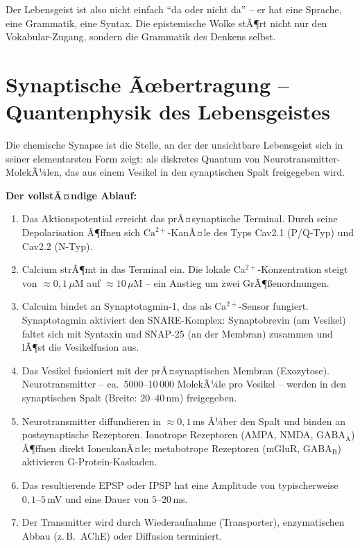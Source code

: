﻿\documentclass[12pt,a4paper]{report}
\theoremstyle{plain}
\theoremstyle{definition}
\theoremstyle{remark}
\begin{document}
	Der Lebensgeist ist also nicht einfach ``da oder nicht da'' -- er hat eine
	Sprache, eine Grammatik, eine Syntax. Die epistemische Wolke stÃ¶rt
	nicht nur den Vokabular-Zugang, sondern die Grammatik des Denkens selbst.
	
	\section{Synaptische Ãœbertragung -- Quantenphysik des Lebensgeistes}
	
	Die chemische Synapse ist die Stelle, an der der unsichtbare Lebensgeist
	sich in seiner elementarsten Form zeigt: als diskretes Quantum von
	Neurotransmitter-MolekÃ¼len, das aus einem Vesikel in den synaptischen
	Spalt freigegeben wird.
	
	\textbf{Der vollstÃ¤ndige Ablauf:}
	\begin{enumerate}[label=\arabic*., leftmargin=1.8cm]
		\item Das Aktionspotential erreicht das prÃ¤synaptische Terminal.
		Durch seine Depolarisation Ã¶ffnen sich $\mathrm{Ca}^{2+}$-KanÃ¤le
		des Typs Cav2.1 (P/Q-Typ) und Cav2.2 (N-Typ).
		\item Calcium strÃ¶mt in das Terminal ein.
		Die lokale Ca$^{2+}$-Konzentration steigt von $\approx 0{,}1\,\mu$M
		auf $\approx 10\,\mu$M -- ein Anstieg um zwei GrÃ¶\ss{}enordnungen.
		\item Calcuim bindet an Synaptotagmin-1, das als Ca$^{2+}$-Sensor fungiert.
		Synaptotagmin aktiviert den SNARE-Komplex: Synaptobrevin (am Vesikel)
		faltet sich mit Syntaxin und SNAP-25 (an der Membran) zusammen
		und lÃ¶st die Vesikelfusion aus.
		\item Das Vesikel fusioniert mit der prÃ¤synaptischen Membran
		(Exozytose). Neurotransmitter -- ca.\ $5000$--$10\,000$ MolekÃ¼le
		pro Vesikel -- werden in den synaptischen Spalt (Breite: $20$--$40$\,nm)
		freigegeben.
		\item Neurotransmitter diffundieren in $\approx 0{,}1$\,ms Ã¼ber den Spalt
		und binden an postsynaptische Rezeptoren.
		Ionotrope Rezeptoren (AMPA, NMDA, GABA$_\mathrm{A}$) Ã¶ffnen
		direkt IonenkanÃ¤le; metabotrope Rezeptoren (mGluR, GABA$_\mathrm{B}$)
		aktivieren G-Protein-Kaskaden.
		\item Das resultierende EPSP oder IPSP hat eine Amplitude von
		typischerweise $0{,}1$--$5$\,mV und eine Dauer von $5$--$20$\,ms.
		\item Der Transmitter wird durch Wiederaufnahme (Transporter),
		enzymatischen Abbau (z.\,B.\ AChE) oder Diffusion terminiert.
	\end{enumerate}
	
\end{document}
